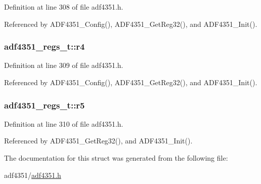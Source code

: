 Definition at line 308 of file adf4351.\+h.



Referenced by A\+D\+F4351\+\_\+\+Config(), A\+D\+F4351\+\_\+\+Get\+Reg32(), and A\+D\+F4351\+\_\+\+Init().

\subsubsection[{\texorpdfstring{r4}{r4}}]{ adf4351\+\_\+regs\+\_\+t\+::r4}\hypertarget{structadf4351__regs__t_a343af9ab05747dd9b977603d02ebb4df}{}\label{structadf4351__regs__t_a343af9ab05747dd9b977603d02ebb4df}


Definition at line 309 of file adf4351.\+h.



Referenced by A\+D\+F4351\+\_\+\+Config(), A\+D\+F4351\+\_\+\+Get\+Reg32(), and A\+D\+F4351\+\_\+\+Init().

\subsubsection[{\texorpdfstring{r5}{r5}}]{ adf4351\+\_\+regs\+\_\+t\+::r5}\hypertarget{structadf4351__regs__t_ab0bd52a2f47aa3f45d0aa97136ec6e8c}{}\label{structadf4351__regs__t_ab0bd52a2f47aa3f45d0aa97136ec6e8c}


Definition at line 310 of file adf4351.\+h.



Referenced by A\+D\+F4351\+\_\+\+Get\+Reg32(), and A\+D\+F4351\+\_\+\+Init().



The documentation for this struct was generated from the following file\+:\begin{DoxyCompactItemize}
\item 
adf4351/\hyperlink{adf4351_8h}{adf4351.\+h}\end{DoxyCompactItemize}
